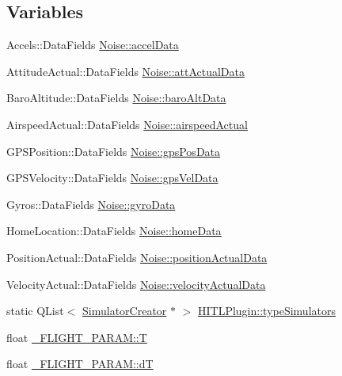 \subsection*{\-Variables}
\begin{DoxyCompactItemize}
\item 
\-Accels\-::\-Data\-Fields \hyperlink{group___h_i_t_l_plugin_ga20a9e1e87d0a44b532c7e8c44555bdde}{\-Noise\-::accel\-Data}
\item 
\-Attitude\-Actual\-::\-Data\-Fields \hyperlink{group___h_i_t_l_plugin_ga689a709ae944673ff6edd54ab6ca4d7d}{\-Noise\-::att\-Actual\-Data}
\item 
\-Baro\-Altitude\-::\-Data\-Fields \hyperlink{group___h_i_t_l_plugin_gab586e8f2c72c1e42c715debf0bd202b1}{\-Noise\-::baro\-Alt\-Data}
\item 
\-Airspeed\-Actual\-::\-Data\-Fields \hyperlink{group___h_i_t_l_plugin_ga6481423a6f6cc57475e660281ba3d77d}{\-Noise\-::airspeed\-Actual}
\item 
\-G\-P\-S\-Position\-::\-Data\-Fields \hyperlink{group___h_i_t_l_plugin_ga9ec5e3f5256aa25ca8a8556643eb355d}{\-Noise\-::gps\-Pos\-Data}
\item 
\-G\-P\-S\-Velocity\-::\-Data\-Fields \hyperlink{group___h_i_t_l_plugin_gafefa36e4fa6d8da826bbfcf9f604119c}{\-Noise\-::gps\-Vel\-Data}
\item 
\-Gyros\-::\-Data\-Fields \hyperlink{group___h_i_t_l_plugin_gaf3fae05e7092b987f81f25ff7709ffb9}{\-Noise\-::gyro\-Data}
\item 
\-Home\-Location\-::\-Data\-Fields \hyperlink{group___h_i_t_l_plugin_ga3138fe65ade5af4ff6ff614c0956fc0a}{\-Noise\-::home\-Data}
\item 
\-Position\-Actual\-::\-Data\-Fields \hyperlink{group___h_i_t_l_plugin_ga54f9e7005f571fdacf23a67005004b0a}{\-Noise\-::position\-Actual\-Data}
\item 
\-Velocity\-Actual\-::\-Data\-Fields \hyperlink{group___h_i_t_l_plugin_ga45f843b87142396306b05148bf19b766}{\-Noise\-::velocity\-Actual\-Data}
\item 
static \-Q\-List$<$ \hyperlink{class_simulator_creator}{\-Simulator\-Creator} $\ast$ $>$ \hyperlink{group___h_i_t_l_plugin_ga0400c2f74f4a0c3cd840f95c99b1b601}{\-H\-I\-T\-L\-Plugin\-::type\-Simulators}
\item 
float \hyperlink{group___h_i_t_l_plugin_ga6c3abbd8306a5eb69384ca36f338991b}{\-\_\-\-F\-L\-I\-G\-H\-T\-\_\-\-P\-A\-R\-A\-M\-::\-T}
\item 
float \hyperlink{group___h_i_t_l_plugin_gabba6faff155324d93353abc952708700}{\-\_\-\-F\-L\-I\-G\-H\-T\-\_\-\-P\-A\-R\-A\-M\-::d\-T}

\end{DoxyCompactItemize}

